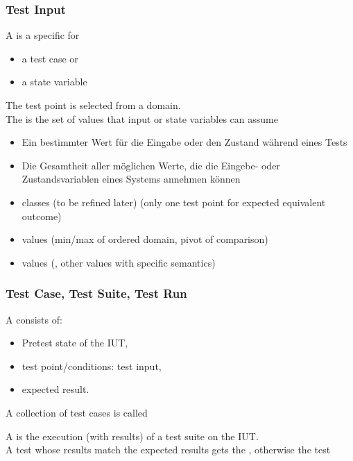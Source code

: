 \subsubsection*{Test Input}
\begin{defBox}[title=Definition(Test(Data) Point)]
    A  is a specific  for
    \begin{itemize}
        \item a test case  or
        \item a state variable
    \end{itemize}
    The test point is selected from a domain.\\
    The  is the set of values that input or state variables can assume
\end{defBox}
\begin{infoBox}
    \begin{itemize}
        \item {} Ein bestimmter Wert für die Eingabe oder den Zustand während eines Tests
        \item {} Die Gesamtheit aller möglichen Werte, die die Eingebe- oder Zustandsvariablen eines Systems annehmen können
    \end{itemize}
\end{infoBox}
\begin{defBox}[title=Heuristics for Test Point Selection]
    \begin{itemize}
        \item {} classes (to be refined later) (only one test point for expected equivalent outcome)
        \item {} values (min/max of ordered domain, pivot of comparison)
        \item {} values (, other values with specific semantics)
    \end{itemize}
\end{defBox}
\subsubsection*{Test Case, Test Suite, Test Run}
\begin{defBox}[title=Definition (Test Case\, Test Suite)]
    A  consists of:
    \begin{itemize}
        \item Pretest state of the IUT, 
        \item test point/conditions: test input,
        \item expected result.
    \end{itemize}
    A collection of test cases is called 
\end{defBox}
\begin{defBox}[title=Definition (Test Run)]
    A  is the execution (with results) of a test suite on the IUT.\\
    A test whose results match the expected results gets the  , otherwise the test 
\end{defBox}
